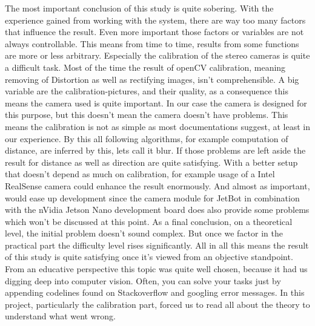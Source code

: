 \documentclass[journal,onecolumn]{IEEEtran}
\begin{document}
\noindent The most important conclusion of this study is quite sobering. With the experience gained from working with the system, there are way too many factors that influence the result. Even more important those factors or variables are not always controllable. This means from time to time, results from some functions are more or less arbitrary. Especially the calibration of the stereo cameras is quite a difficult task. Most of the time the result of openCV calibration, meaning removing of Distortion as well as rectifying images, isn't comprehensible. A big variable are the calibration-pictures, and their quality, as a consequence this means the camera used is quite important. In our case the camera is designed for this purpose, but this doesn't mean the camera doesn't have problems. This means the calibration is not as simple as most documentations suggest, at least in our experience. By this all following algorithms, for example computation of distance, are inferred by this, lets call it blur. \newline
If those problems are left aside the result for distance as well as direction are quite satisfying. With a better setup that doesn't depend as much on calibration, for example usage of a Intel RealSense camera could enhance the result enormously. And almost as important, would ease up development since the camera module for JetBot in combination with the nVidia Jetson Nano development board does also provide some problems which won't be discussed at this point. \newline
As a final conclusion, on a theoretical level, the initial problem doesn't sound complex. But once we factor in the practical part the difficulty level rises significantly. All in all this means the result of this study is quite satisfying once it's viewed from an objective standpoint. \newline
From an educative perspective this topic was quite well chosen, because it had us digging deep into computer vision. Often, you can solve your tasks just by appending codelines found on Stackoverflow and googling error messages. In this project, particularly the calibration part, forced us to read all about the theory to understand what went wrong.
\appendices

%
{}


%
\end{document}

